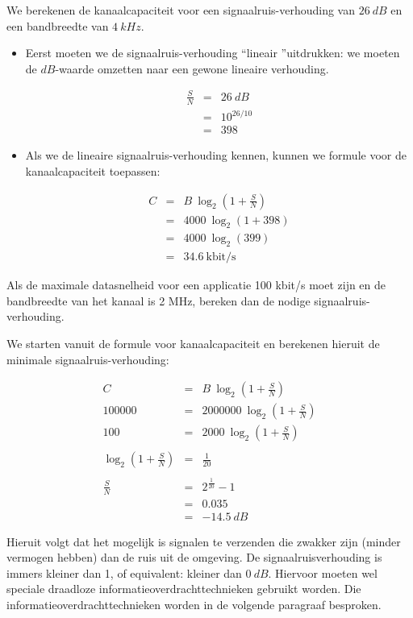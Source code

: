 \begin{voorbeeld}
We berekenen de kanaalcapaciteit voor een signaalruis-verhouding van $26~dB$ en een bandbreedte van $4~kHz$.

\begin{itemize}
    \item Eerst moeten we de signaalruis-verhouding \textquotedblleft lineair \textquotedblright uitdrukken: we moeten de $dB$-waarde omzetten naar een gewone lineaire verhouding.
    
    \begin{eqnarray*}
        \frac{S}{N} &=& 26~dB \\
        &=& 10^{26/10} \\
        &=& 398
    \end{eqnarray*}
    
    \item Als we de lineaire signaalruis-verhouding kennen, kunnen we formule voor de kanaalcapaciteit toepassen:
    
    \begin{eqnarray*}
    C &=& B ~ \log_2(1+\frac{S}{N}) \\
    &=& 4000 ~ \log_2(1+398) \\
    &=& 4000 ~ \log_2(399) \\
    &=& 34.6 ~\text{kbit/s}
    \end{eqnarray*}
\end{itemize}
\end{voorbeeld}

\begin{voorbeeld}
Als de maximale datasnelheid voor een applicatie 100 kbit/s moet zijn en de bandbreedte van het kanaal is 2 MHz, bereken dan de nodige signaalruis-verhouding.

We starten vanuit de formule voor kanaalcapaciteit en berekenen hieruit de minimale signaalruis-verhouding:

    \begin{eqnarray*}
    C &=& B ~ \log_2(1+\frac{S}{N}) \\
    \num{100 000} &=& \num{2000000} ~ \log_2(1+\frac{S}{N}) \\
    100 &=& 2000 ~ \log_2(1+\frac{S}{N}) \\
    \\
    \log_2(1+\frac{S}{N}) &=& \frac{1}{20} \\
    \\
    \frac{S}{N} &=& 2^{\frac{1}{20}}-1 \\
    &=& 0.035 \\
    &=& -14.5~dB
    \end{eqnarray*}
    
Hieruit volgt dat het mogelijk is signalen te verzenden die zwakker zijn (minder vermogen hebben) dan de ruis uit de omgeving. De signaalruisverhouding is immers kleiner dan 1, of equivalent: kleiner dan $0~dB$. Hiervoor moeten wel speciale draadloze informatieoverdrachttechnieken gebruikt worden. Die informatieoverdrachttechnieken worden in de volgende paragraaf besproken.
\end{voorbeeld}

